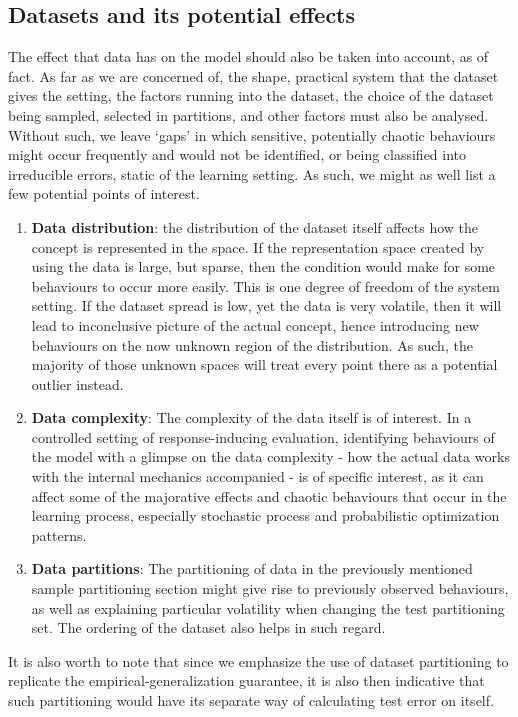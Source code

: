 \documentclass[10pt,oneside,oldfontcommands,dvipsnames,article]{memoir}
\begin{document}
\subsection{Datasets and its potential effects}

The effect that data has on the model should also be taken into account, as of fact. As far as we are concerned of, the shape, practical system that the dataset gives the setting, the factors running into the dataset, the choice of the dataset being sampled, selected in partitions, and other factors must also be analysed. Without such, we leave `gaps' in which sensitive, potentially chaotic behaviours might occur frequently and would not be identified, or being classified into irreducible errors, static of the learning setting. As such, we might as well list a few potential points of interest. 
\begin{enumerate}[itemsep=1pt,topsep=0.5pt]
  \item \textbf{Data distribution}: the distribution of the dataset itself affects how the concept is represented in the space. If the representation space created by using the data is large, but sparse, then the condition would make for some behaviours to occur more easily. This is one degree of freedom of the system setting. If the dataset spread is low, yet the data is very volatile, then it will lead to inconclusive picture of the actual concept, hence introducing new behaviours on the now unknown region of the distribution. As such, the majority of those unknown spaces will treat every point there as a potential outlier instead. 
  \item \textbf{Data complexity}: The complexity of the data itself is of interest. In a controlled setting of response-inducing evaluation, identifying behaviours of the model with a glimpse on the data complexity - how the actual data works with the internal mechanics accompanied - is of specific interest, as it can affect some of the majorative effects and chaotic behaviours that occur in the learning process, especially stochastic process and probabilistic optimization patterns. 
  \item \textbf{Data partitions}: The partitioning of data in the previously mentioned sample partitioning section might give rise to previously observed behaviours, as well as explaining particular volatility when changing the test partitioning set. The ordering of the dataset also helps in such regard. 
\end{enumerate}
It is also worth to note that since we emphasize the use of dataset partitioning to replicate the empirical-generalization guarantee, it is also then indicative that such partitioning would have its separate way of calculating test error on itself. 
\end{document}
